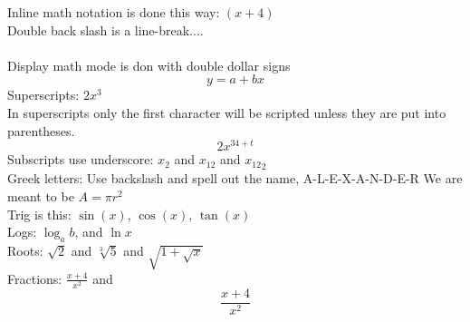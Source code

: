 \documentclass[11pt]{article}
\begin{document}
Inline math notation is done this way: $(x+4)$ \\
Double back slash is a line-break....\\
\\
Display math mode is don with double dollar signs
$$y=a+bx$$
Superscripts: $2x^3$\\
In superscripts only the first character will be scripted unless they are put into
parentheses. $$2x^{34+t}$$
Subscripts use underscore: $x_2$ and $x_{12}$ and ${x_{12}}_2$\\
Greek letters: Use backslash and spell out the name, A-L-E-X-A-N-D-E-R We are meant to be $A=\pi r^2$\\
Trig is this: $\sin(x)$, $\cos(x)$, $\tan(x)$\\
Logs: $\log_a{b}$, and $\ln{x}$\\
Roots: $\sqrt{2}$ and $\sqrt[3]{5}$ and $\sqrt{1+\sqrt{x}}$
\\
Fractions: $\displaystyle{ \frac{x+4}{x^2}} $ and $$\frac{x+4}{x^2}$$
\end{document}
